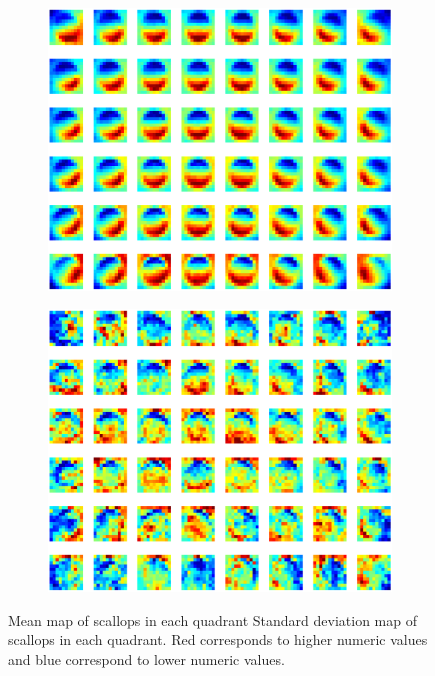 \documentclass {udthesis}
\begin{document}
\begin{figure}
  \centering
  \begin{subfigure}[]{0.45\textwidth}
      \includegraphics[width=\textwidth]{mean_scallop_quadrants}
      \caption{}
      \label{subfig:mean_quadrant}
  \end{subfigure}
  \begin{subfigure}[]{0.45\textwidth}
      \includegraphics[width=\textwidth]{stddev_scallop_quadrants}        
      \caption{}
      \label{subfig:stddev_quadrant}
  \end{subfigure}
  \caption{ Mean map of scallops in each quadrant  Standard deviation map of scallops in each quadrant.
  Red corresponds to higher numeric values and blue correspond to lower numeric values.}
  \label{fig:mean_stddev_quadrant}
\end{figure}
\end{document}
